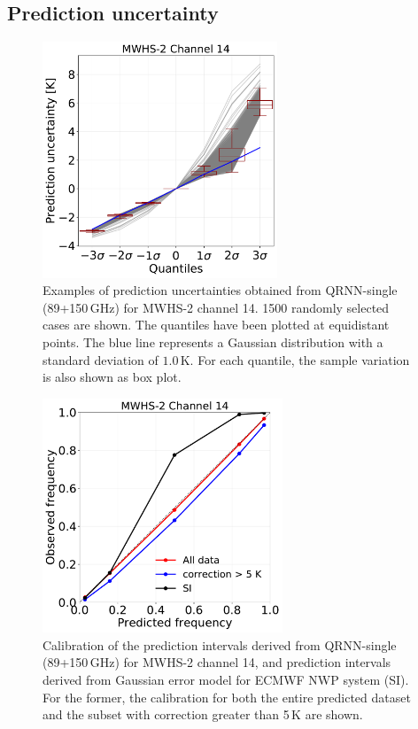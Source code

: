 \documentclass[amt, manuscript]{copernicus}
\begin{document}
\subsection{Prediction uncertainty}
\label{sec:uncertainty_mwhs}
\begin{figure}[t]
	\includegraphics[width = 70mm]{Figures/fig05.pdf}	
	\caption{Examples of prediction uncertainties obtained from QRNN-single (89+150\,GHz) for MWHS-2 channel 14. 1500 randomly selected cases are shown. The quantiles have been plotted at equidistant points. The blue line represents a Gaussian distribution with a standard deviation of $1.0$\,K. For each quantile, the sample variation is also shown as box plot. }
	\label{fig:prediction_uncertainty_mwhs}	
\end{figure}
\begin{figure}[t]
	\includegraphics[height = 70mm]{Figures/fig06.pdf}	
	\caption{Calibration of the prediction intervals derived from QRNN-single (89+150\,GHz) for MWHS-2 channel 14, and prediction intervals derived from Gaussian error model for ECMWF NWP system (SI). For the former, the calibration for both the entire predicted dataset and the subset with correction greater than 5\,K are shown. }
	\label{fig:calibration_mwhs}	
\end{figure}
\end{document}
